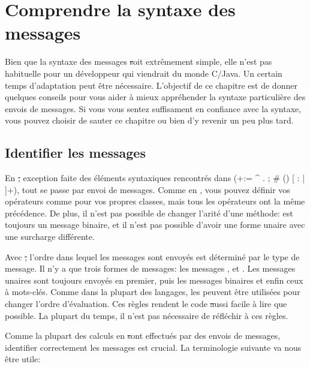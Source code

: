 \documentclass[a4paper,10pt,twoside]{book}
\begin{document}
	\renewcommand{\nnbb}[2]{} %
	\sloppy
\fi
\chapter{Comprendre la syntaxe des messages}

Bien que la syntaxe des messages \st soit extrêmement simple, elle n'est pas 
habituelle pour un développeur qui viendrait du monde C/Java. Un certain temps d'adaptation peut être nécessaire. L'objectif de ce chapitre est de donner quelques conseils pour vous aider à mieux appréhender la syntaxe particulière  des envois de messages.
Si vous vous sentez suffisament en confiance avec la syntaxe, vous pouvez choisir de sauter 
ce chapitre ou bien d'y revenir un peu plus tard.

\section{Identifier les messages}

En \st, exception faite des éléments syntaxiques rencontrés dans
 (\ct+:= ^ . ; # () {} [ : | ]+), tout se passe par envoi de messages.
Comme en , vous pouvez définir vos opérateurs comme \ct{+} pour vos propres 
classes, mais tous les opérateurs ont la même précédence.
De plus, il n'est pas possible de changer l'arité d'une méthode:
\ct{-} est toujours un message binaire, et il n'est pas possible
d'avoir une forme unaire avec une surcharge différente.

Avec \st, l'ordre dans lequel les messages sont envoyés est
déterminé par le type de message. Il n'y a que trois formes de
messages: les messages ,
 et .
 Les messages unaires sont toujours envoyés en premier, puis
les messages binaires et enfin ceux à mots-clés. Comme dans la
plupart des langages,  les  peuvent être utilisées 
pour changer l'ordre d'évaluation. Ces règles rendent le code \st 
aussi facile à lire que possible. La plupart du temps, il n'est pas 
nécessaire de réfléchir à ces règles.

Comme la plupart des calculs en \st sont effectués par des envois de 
messages, identifier correctement les messages est crucial. La terminologie 
suivante va nous être utile:
\end{document}
